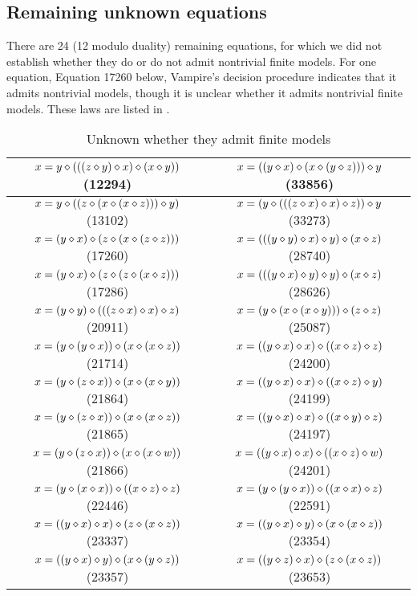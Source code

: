\subsection*{Remaining unknown equations}

There are 24 (12 modulo duality) remaining equations, for which we did not establish whether they do or do not admit nontrivial finite models.
For one equation, Equation 17260 below, Vampire's decision procedure indicates that it admits nontrivial models, though it is unclear whether it admits nontrivial finite models.
These laws are listed in .

\begin{table}[h]
\begin{tabular}{|c|c|}
\hline
$x = y \diamond (((z \diamond y) \diamond x) \diamond (x \diamond y))$ (12294) & $x = ((y \diamond x) \diamond (x \diamond (y \diamond z))) \diamond y$ (33856) \\ \hline
$x = y \diamond ((z \diamond (x \diamond (x \diamond z))) \diamond y)$ (13102) & $x = (y \diamond (((z \diamond x) \diamond x) \diamond z)) \diamond y$ (33273) \\ \hline
$x = (y \diamond x) \diamond (z \diamond (x \diamond (z \diamond z)))$ (17260) & $x = (((y \diamond y) \diamond x) \diamond y) \diamond (x \diamond z)$ (28740) \\ \hline
$x = (y \diamond x) \diamond (z \diamond (z \diamond (x \diamond z)))$ (17286) & $x = (((y \diamond x) \diamond y) \diamond y) \diamond (x \diamond z)$ (28626) \\ \hline
$x = (y \diamond y) \diamond (((z \diamond x) \diamond x) \diamond z)$ (20911) & $x = (y \diamond (x \diamond (x \diamond y))) \diamond (z \diamond z)$ (25087) \\ \hline
$x = (y \diamond (y \diamond x)) \diamond (x \diamond (x \diamond z))$ (21714) & $x = ((y \diamond x) \diamond x) \diamond ((x \diamond z) \diamond z)$ (24200) \\ \hline
$x = (y \diamond (z \diamond x)) \diamond (x \diamond (x \diamond y))$ (21864) & $x = ((y \diamond x) \diamond x) \diamond ((x \diamond z) \diamond y)$ (24199) \\ \hline
$x = (y \diamond (z \diamond x)) \diamond (x \diamond (x \diamond z))$ (21865) & $x = ((y \diamond x) \diamond x) \diamond ((x \diamond y) \diamond z)$ (24197) \\ \hline
$x = (y \diamond (z \diamond x)) \diamond (x \diamond (x \diamond w))$ (21866) & $x = ((y \diamond x) \diamond x) \diamond ((x \diamond z) \diamond w)$ (24201) \\ \hline
$x = (y \diamond (x \diamond x)) \diamond ((x \diamond z) \diamond z)$ (22446) & $x = (y \diamond (y \diamond x)) \diamond ((x \diamond x) \diamond z)$ (22591) \\ \hline
$x = ((y \diamond x) \diamond x) \diamond (z \diamond (x \diamond z))$ (23337) & $x = ((y \diamond x) \diamond y) \diamond (x \diamond (x \diamond z))$ (23354) \\ \hline
$x = ((y \diamond x) \diamond y) \diamond (x \diamond (y \diamond z))$ (23357) & $x = ((y \diamond z) \diamond x) \diamond (z \diamond (x \diamond z))$ (23653) \\ \hline
\end{tabular}
\caption{Unknown whether they admit finite models}
\label{table3}
\end{table}
